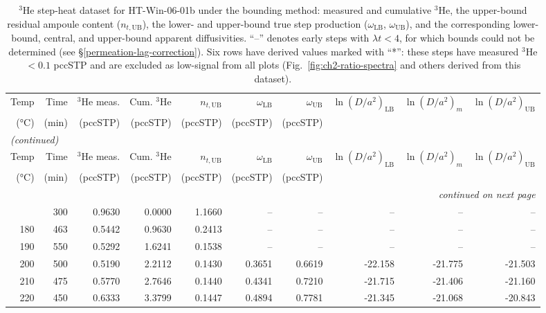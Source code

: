 \begin{landscape}
\begin{footnotesize}
\begin{longtable}{r r r r r r r r r r}
\caption{$^3$He step-heat dataset for HT-Win-06-01b under the bounding method: measured and cumulative $^3$He, the upper-bound residual ampoule content ($n_{t,\mathrm{UB}}$), the lower- and upper-bound true step production ($\omega_{\mathrm{LB}}$, $\omega_{\mathrm{UB}}$), and the corresponding lower-bound, central, and upper-bound apparent diffusivities. ``--'' denotes early steps with $\lambda t < 4$, for which bounds could not be determined (see \S\ref{permeation-lag-correction}). Six rows have derived values marked with ``*'': these steps have measured $^3$He $<0.1$ pccSTP and are excluded as low-signal from all plots (Fig.~\ref{fig:ch2-ratio-spectra} and others derived from this dataset).}\label{tab:ch2-distilled-3he}\\
\toprule
Temp & Time & $^3$He meas. & Cum. $^3$He & $n_{t,\mathrm{UB}}$ & $\omega_{\mathrm{LB}}$ & $\omega_{\mathrm{UB}}$ & $\ln(D/a^2)_{\mathrm{LB}}$ & $\ln(D/a^2)_{m}$ & $\ln(D/a^2)_{\mathrm{UB}}$ \\
(°C) & (min) & (pccSTP) & (pccSTP) & (pccSTP) & (pccSTP) & (pccSTP) &  &  &  \\
\midrule
\endfirsthead
\multicolumn{10}{l}{\textit{(continued)}} \\
\toprule
Temp & Time & $^3$He meas. & Cum. $^3$He & $n_{t,\mathrm{UB}}$ & $\omega_{\mathrm{LB}}$ & $\omega_{\mathrm{UB}}$ & $\ln(D/a^2)_{\mathrm{LB}}$ & $\ln(D/a^2)_{m}$ & $\ln(D/a^2)_{\mathrm{UB}}$ \\
(°C) & (min) & (pccSTP) & (pccSTP) & (pccSTP) & (pccSTP) & (pccSTP) &  &  &  \\
\midrule
\endhead
\midrule
\multicolumn{10}{r}{\textit{continued on next page}} \\
\endfoot
\bottomrule
\endlastfoot
170 & 300 & 0.9630 & 0.0000 & 1.1660 & -- & -- & -- & -- & -- \\
180 & 463 & 0.5442 & 0.9630 & 0.2413 & -- & -- & -- & -- & -- \\
190 & 550 & 0.5292 & 1.6241 & 0.1538 & -- & -- & -- & -- & -- \\
200 & 500 & 0.5190 & 2.2112 & 0.1430 & 0.3651 & 0.6619 & -22.158 & -21.775 & -21.503 \\
210 & 475 & 0.5770 & 2.7646 & 0.1440 & 0.4341 & 0.7210 & -21.715 & -21.406 & -21.160 \\
220 & 450 & 0.6333 & 3.3799 & 0.1447 & 0.4894 & 0.7781 & -21.345 & -21.068 & -20.843 \\

\end{longtable}
\end{footnotesize}
\end{landscape}
